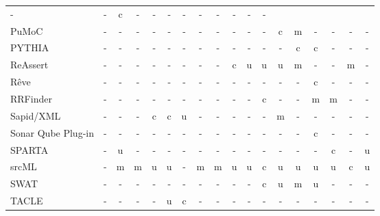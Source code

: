 \begin{longtable}{ l *{17}{c} }
      - &
      - &
      c &
      - &
      - &
      - &
      - &
      - &
      - &
      - &
      - &
      - \\
    PuMoC &
      - &
      - &
      - &
      - &
      - &
      - &
      - &
      - &
      - &
      - &
      - &
      c &
      m &
      - &
      - &
      - &
      - \\
    PYTHIA &
      - &
      - &
      - &
      - &
      - &
      - &
      - &
      - &
      - &
      - &
      - &
      - &
      c &
      c &
      - &
      - &
      - \\
    ReAssert &
      - &
      - &
      - &
      - &
      - &
      - &
      - &
      - &
      c &
      u &
      u &
      u &
      m &
      - &
      - &
      m &
      - \\
    Rêve &
      - &
      - &
      - &
      - &
      - &
      - &
      - &
      - &
      - &
      - &
      - &
      - &
      - &
      c &
      - &
      - &
      - \\
    RRFinder &
      - &
      - &
      - &
      - &
      - &
      - &
      - &
      - &
      - &
      - &
      c &
      - &
      - &
      m &
      m &
      - &
      - \\
    Sapid/XML &
      - &
      - &
      - &
      c &
      c &
      u &
      - &
      - &
      - &
      - &
      - &
      m &
      - &
      - &
      - &
      - &
      - \\
    Sonar Qube Plug-in &
      - &
      - &
      - &
      - &
      - &
      - &
      - &
      - &
      - &
      - &
      - &
      - &
      - &
      c &
      - &
      - &
      - \\
    SPARTA &
      - &
      u &
      - &
      - &
      - &
      - &
      - &
      - &
      - &
      - &
      - &
      - &
      - &
      - &
      c &
      - &
      u \\
    srcML &
      - &
      m &
      m &
      u &
      u &
      - &
      m &
      m &
      u &
      u &
      c &
      u &
      u &
      u &
      u &
      c &
      u \\
    SWAT &
      - &
      - &
      - &
      - &
      - &
      - &
      - &
      - &
      - &
      - &
      c &
      u &
      m &
      u &
      - &
      - &
      - \\
    TACLE &
      - &
      - &
      - &
      - &
      u &
      c &
      - &
      - &
      - &
      - &
      - &
      - &
      - &
      - &
      - &
      - &
      - \\

\end{longtable}
